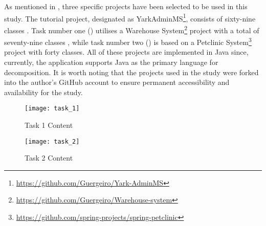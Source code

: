 As mentioned in , three specific projects have been
selected to be used in this study. The tutorial project, designated as
YarkAdminMS\footnote{\url{https://github.com/Guergeiro/Yark-AdminMS}}, consists
of sixty-nine classes \cite{brito2021identification}. Task number one
() utilises a Warehouse
System\footnote{\url{https://github.com/Guergeiro/Warehouse-system}} project
with a total of seventy-nine classes \cite{brito2021identification}, while task
number two () is based on a Petclinic
System\footnote{\url{https://github.com/spring-projects/spring-petclinic}}
project with forty classes. All of these projects are implemented in Java
since, currently, the application supports Java as the primary language for
decomposition. It is worth noting that the projects used in the study were
forked into the author's GitHub account to ensure permanent accessibility and
availability for the study.

\begin{figure*}[!htb]
  \caption{Tasks Contents}
  \centering
  \begin{subfigure}[b]{0.49\textwidth}
    \caption{Task 1 Content}
    \label{fig:task1_content}
    \centering
    \texttt{[image: task\_1]}
  \end{subfigure}
  \hfill
  \begin{subfigure}[b]{0.49\textwidth}
    \caption{Task 2 Content}
    \label{fig:task2_content}
    \centering
    \texttt{[image: task\_2]}
  \end{subfigure}
\end{figure*}
